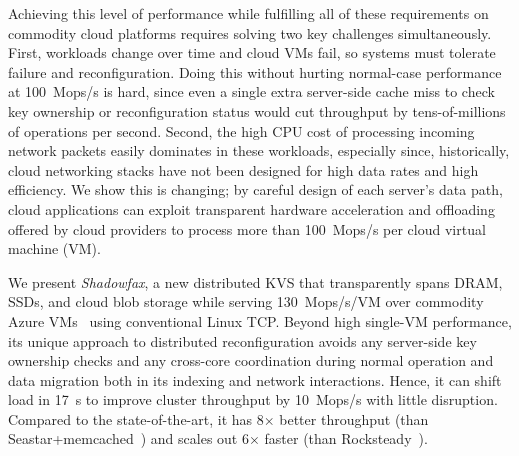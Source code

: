 Achieving this level of performance while fulfilling all of these
requirements on commodity cloud platforms requires solving two key challenges
simultaneously.
%
First, workloads change over time and cloud VMs fail, so systems must tolerate
failure and reconfiguration.
%
Doing this without hurting normal-case performance at 100~Mops/s is hard, since
even a single extra server-side cache miss to check key ownership or
reconfiguration status would cut throughput by tens-of-millions of operations
per second.
%
Second, the high CPU cost of processing incoming network
packets easily dominates in these workloads,
especially since, historically, cloud networking stacks have not been designed
for high data rates and high efficiency.
%
We show this is changing; by careful design of each server's data path, cloud
applications can exploit transparent hardware acceleration and offloading
offered by cloud providers to process more than 100~Mops/s per cloud virtual
machine (VM).

We present \emph{Shadowfax}, a new distributed KVS that transparently
spans DRAM, SSDs, and cloud blob storage while serving 130~Mops/s/VM over
commodity Azure VMs~\cite{azure} using conventional Linux TCP.
%
Beyond high single-VM performance, its unique approach to
distributed reconfiguration avoids any server-side key ownership checks
and any cross-core coordination during
normal operation and data migration both in its indexing and network interactions.
%
Hence,
it can shift load in 17~s to improve cluster throughput by
10~Mops/s
with little disruption.
%
Compared to the state-of-the-art, it has 8$\times{}$ better throughput (than
Seastar+memcached~\cite{seastar}) and scales out 6$\times{}$ faster (than
Rocksteady~\cite{rocksteady}).

